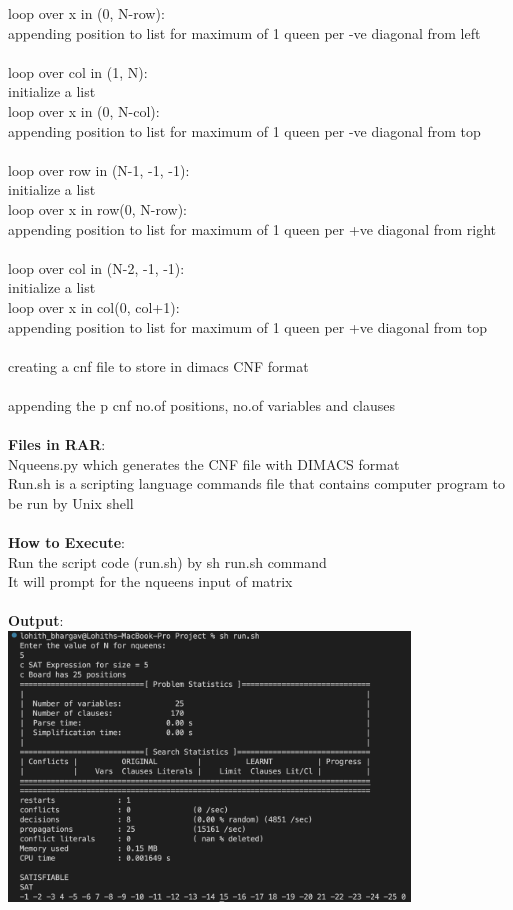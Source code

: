 \documentclass[12pt, letterpaper]{article}
\begin{document}
\indent \indent    	loop over x in (0, N-row):\\
\indent        appending position to list for maximum of 1 queen per -ve diagonal from left\\
\\loop over col in (1, N): \\
\indent \indent	initialize a list  \\
\indent \indent    	loop over x in (0, N-col):\\
\indent        appending position to list for maximum of 1 queen per -ve diagonal from top\\
\\loop over row in (N-1, -1, -1): \\
\indent \indent	initialize a list  \\
\indent \indent    	loop over x in row(0, N-row):\\
\indent        appending position to list for maximum of 1 queen per +ve diagonal from right\\
\\loop over col in (N-2, -1, -1): \\
\indent \indent	initialize a list  \\
\indent \indent    	loop over x in col(0, col+1):\\
\indent        appending position to list for maximum of 1 queen per +ve diagonal from top\\
\\creating a cnf file to store in dimacs CNF format\\
\\appending the p cnf no.of positions, no.of variables and clauses\\
\\ \textbf{Files in RAR}:\\
Nqueens.py which generates the CNF file with DIMACS format \\
Run.sh is a scripting language commands file that contains computer program to be run by Unix shell \\
\\ \textbf{How to Execute}:\\
Run the script code (run.sh) by sh run.sh command\\
It will prompt for the nqueens input of matrix\\
\\ \textbf{Output}: \\
\includegraphics[width=0.8\textwidth]{Output.png}
\end{document}

